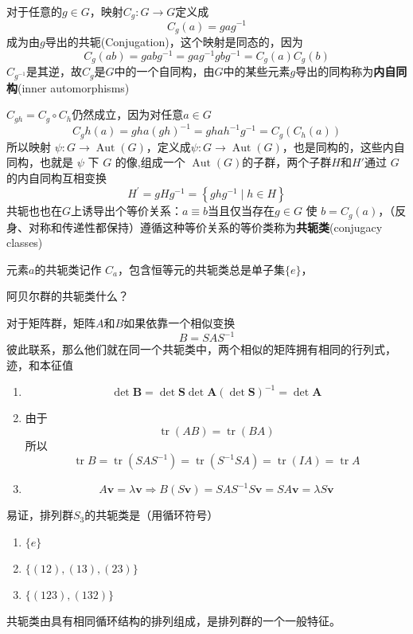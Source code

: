 对于任意的$g\in G$，映射$C_g:G\rightarrow G $定义成
\begin{equation}\label{eq:2.14}
    C_{g}(a)=g a g^{-1}
\end{equation}
成为由$g$导出的共轭(Conjugation)，这个映射是同态的，因为$$
C_{g}(a b)=g a b g^{-1}=g a g^{-1} g b g^{-1}=C_{g}(a) C_{g}(b)
$$
$C_{g^{-1}}$是其逆，故$C_g$是$G$中的一个自同构，由$G$中的某些元素$g$导出的同构称为\textbf{内自同构}(inner automorphisms)

$C_{g h}=C_{g} \circ C_{h}$仍然成立，因为对任意$a\in G$
$$
C_{g} h(a)=g h a(g h)^{-1}=g h a h^{-1} g^{-1}=C_{g}\left(C_{h}(a)\right)
$$
所以映射 $\psi: G \rightarrow \operatorname{Aut}(G)$，定义成$\psi: G \rightarrow \operatorname{Aut}(G)$，也是同构的，这些内自同构，也就是 $\psi$  下 $G$  的像,组成一个 $\operatorname{Aut}(G)$的子群，两个子群\(H\)和\(H'\)通过 $G$的内自同构互相变换
$$
H^{\prime}=g H g^{-1}=\left\{g h g^{-1} \mid h \in H\right\}
$$
共轭也也在\(G\)上诱导出个等价关系：$a \equiv b$当且仅当存在\(g\in G\) 使 $b=C_{g}(a)$，（反身、对称和传递性都保持）遵循这种等价关系的等价类称为\textbf{共轭类}(conjugacy classes)

元素$a$的共轭类记作 $C_a$，包含恒等元的共轭类总是单子集\(\{e\}\)，

\begin{exercise}
    阿贝尔群的共轭类什么？
\end{exercise}
\begin{eg}
    对于矩阵群，矩阵$A$和\(B\)如果依靠一个相似变换
    \[B=SAS^{-1}\]彼此联系，那么他们就在同一个共轭类中，两个相似的矩阵拥有相同的行列式，迹，和本征值
    \begin{enumerate}
        \item $$
        \operatorname{det} \mathbf{B}=\operatorname{det} \mathbf{S} \operatorname{det} \mathbf{A}(\operatorname{det} \mathbf{S})^{-1}=\operatorname{det} \mathbf{A}
        $$
        \item 由于\begin{equation}\label{eq:2.15}
            \operatorname{tr} (AB)=\operatorname{tr} (BA)
        \end{equation}
        所以$$
        \operatorname{tr} B=\operatorname{tr}\left(S A S^{-1}\right)=\operatorname{tr}\left(S^{-1} S A\right)=\operatorname{tr}(I A)=\operatorname{tr} A
        $$
        \item $$
        A\mathbf{v}=\lambda \mathbf{v} \Longrightarrow B(S \mathbf{v})=SAS^{-1} S \mathbf{v}=SA \mathbf{v}=\lambda S\mathbf{v}
        $$
    \end{enumerate}
\end{eg}
\begin{eg}
    易证，排列群\(S_3\)的共轭类是（用循环符号）
    \begin{enumerate}
        \item $\{e\}$
        \item $\{(12),(13),(23)\}$
        \item $\{(123),(132)\} $
    \end{enumerate}
    共轭类由具有相同循环结构的排列组成，是排列群的一个一般特征。
\end{eg}
